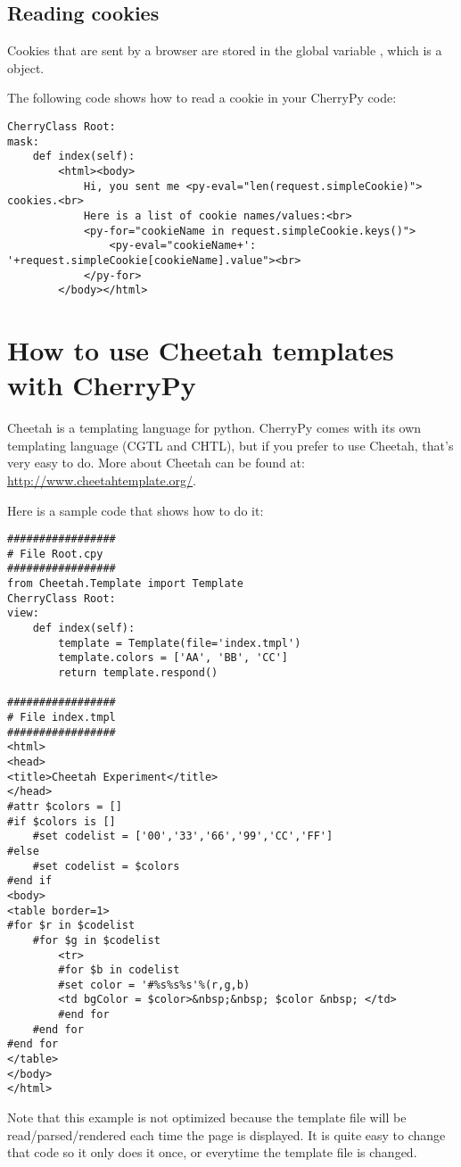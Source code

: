\documentclass{manual}
\begin{document}
\section{Reading cookies}
Cookies that are sent by a browser are stored in the global variable , which is
a  object.

The following code shows how to read a cookie in your CherryPy code:
\begin{verbatim}
CherryClass Root:
mask:
    def index(self):
        <html><body>
            Hi, you sent me <py-eval="len(request.simpleCookie)"> cookies.<br>
            Here is a list of cookie names/values:<br>
            <py-for="cookieName in request.simpleCookie.keys()">
                <py-eval="cookieName+': '+request.simpleCookie[cookieName].value"><br>
            </py-for>
        </body></html>

\end{verbatim}

\chapter{How to use Cheetah templates with CherryPy}

Cheetah is a templating language for python. CherryPy comes with its own templating language (CGTL and CHTL), but if you prefer to use Cheetah, that's very easy to do. More about Cheetah can be found at:
\url{http://www.cheetahtemplate.org/}.

Here is a sample code that shows how to do it:
\begin{verbatim}
#################
# File Root.cpy
#################
from Cheetah.Template import Template
CherryClass Root:
view:
    def index(self):
        template = Template(file='index.tmpl')
        template.colors = ['AA', 'BB', 'CC']
        return template.respond()
    
#################
# File index.tmpl
#################
<html>
<head>
<title>Cheetah Experiment</title>
</head>
#attr $colors = []
#if $colors is []
    #set codelist = ['00','33','66','99','CC','FF']
#else 
    #set codelist = $colors
#end if
<body>
<table border=1>
#for $r in $codelist
    #for $g in $codelist
        <tr>
        #for $b in codelist
        #set color = '#%s%s%s'%(r,g,b)
        <td bgColor = $color>&nbsp;&nbsp; $color &nbsp; </td>
        #end for
    #end for
#end for
</table>
</body>
</html>
\end{verbatim}

Note that this example is not optimized because the template file will be read/parsed/rendered each time the page is displayed. It is quite easy to change that code so it only does it once, or everytime the template file is changed.
\end{document}
